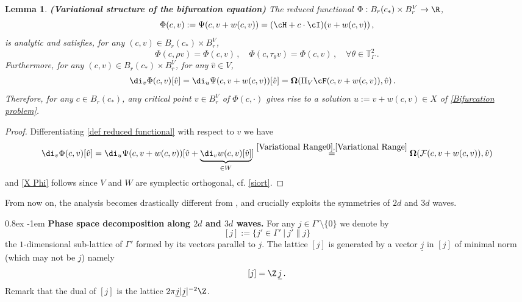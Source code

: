 \documentclass[11pt,a4paper,reqno]{article}
\makeatletter
\renewcommand{\paragraph}{%
  \@startsection{paragraph}{4}{\z@}%
  {0.8ex}  %
  {-1em}   %
  {\normalfont\bfseries}%
}
\numberwithin{equation}{section}
\newtheorem{lemma}[theorem]{Lemma}
\theoremstyle{definition}
\makeatother
\begin{document}
\begin{lemma}\label{lem:varia}
 {\bf (Variational 
 structure of the bifurcation equation)}
The reduced functional   $\Phi:B_{r}(c_*)\times B_{r}^V \to \R$,  
\begin{equation}\label{def reduced functional}
        \Phi(c,v):= \Psi (c, v + w(c,v)) = 
        (\cH + c\cdot \cI )(v+w(c,v))  \, , 
    \end{equation}
    is analytic and satisfies, for any   $(c,v)\in  B_r(c_*) \times  B_r^V $,
    \begin{equation}\label{symmetriesPhi}
        \Phi (c, \rho v)= \Phi (c, v) \, , \quad  
        \Phi( c, \tau_\theta v)= \Phi (c,v) \, , \quad\forall \theta\in \mathbb{T}^2_\Gamma  \, . 
    \end{equation} 
Furthermore, for any $ (c,v)\in B_{r}(c_*)\times B_{r}^V $, for any $ \hat v\in V $, 
    \begin{align}\label{X Phi}
        \di_v\Phi(c,v)[\hat v]   = 
        \di_u \Psi (c, v + w(c,v))[\hat v ] 
        & = 
        \boldsymbol{\Omega}(\Pi_{V}
        \cF (c,v+w(c,v)),\hat v)   \, .  
    \end{align}
    Therefore, for any $c\in B_{r}(c_*)$, any critical point  $v \in B_{r}^V $ of $\Phi(c,\cdot)$ gives rise to a solution $u := v+w(c,v) \in X $ of \eqref{Bifurcation problem}.
\end{lemma}

\begin{proof}
Differentiating
\eqref{def reduced functional} with respect to $ v $ we have 
    $$
        \di_v\Phi(c,v)[\hat v]  = \di_u \Psi (c, v+w(c,v))[\hat v + \underbrace{\di_v w(c,v)[\hat  v]}_{\in W}]
      \stackrel{\eqref{Variational Range0}, \eqref{Variational Range}} = \boldsymbol{\Omega}({\cal F}(c,v+w(c,v)),\hat v) 
    $$
and 
\eqref{X Phi} follows since  
$ V $ and $ W $ are symplectic orthogonal, cf. \eqref{siort}.    \end{proof}

From now on, the analysis 
becomes drastically different from \cite{CN}, and crucially exploits the symmetries of $2d$ and $3d$ waves.

\paragraph{\bf Phase space decomposition along $2d$ and $3d$ waves.} For any $j\in\Gamma'\setminus\{0\}$ we denote by  
\begin{equation}\label{1dfs}
 [j]:= 
\big\{ j'\in \Gamma' \ | \  
j'\parallel j \big\} 
\end{equation}
the $1$-dimensional 
sub-lattice of $ \Gamma' $ formed by its vectors parallel to $j $.  The lattice 
$ [j]$ is generated by a vector $ \underline{j} $ in $ [j]$
of minimal norm (which may not be $ j $)
namely
\begin{equation}\label{minimalj}
[j] = \Z \, \underline{j} \, . 
\end{equation}
Remark that the dual of $ [j] $ is the lattice 
$ 2 \pi \underline{j} |\underline j|^{-2}  \Z  $.
\end{document}
